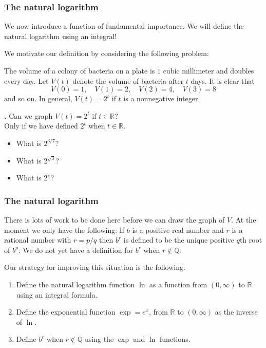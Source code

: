 \documentclass[t]{beamer}
\theoremstyle{plain}
\theoremstyle{definition}
\newcounter{heading}
\newcommand{\newhead}[1]{\medskip\stepcounter{heading}\noindent\textbf{\hspace{0.2cm}{#1}.}}
\newcommand{\RR}{\mathbb{R}}
\newcommand{\Q}{\mathbb{Q}}
\begin{document}
\begin{frame}
\frametitle{The natural logarithm}
\noindent We now introduce a function of fundamental importance.  We will define the natural logarithm using an integral!  \pause


\noindent We motivate our definition by considering the following problem:\pause

\medskip

\noindent The volume of a colony of bacteria on a plate is $1$ cubic millimeter and doubles every day. Let $V(t)$ denote the volume of bacteria after $t$ days. It is clear that
\[V(0)=1,\quad V(1)=2, \quad V(2)=4,\quad V(3)=8\]
and so on. In general, $V(t)=2^t$ if $t$ is a nonnegative integer.\pause

\vfill
\newhead{Question} Can we graph $V(t)=2^t$ if $t\in\RR$?\\ Only if we have defined $2^t$ when $t\in\RR$.
\begin{itemize}[<+->]
\item What is $2^{3/7}$?
\item What is $2^{\sqrt{3}}$?
\item What is $2^{\pi}$?
\end{itemize}
\end{frame}

\begin{frame}
\frametitle{The natural logarithm}
\noindent There is lots of work to be done here before we can draw the graph of $V$. At the moment we only have the following: If $b$ is a positive real number and $r$ is a rational number with $r=p/q$ then $b^r$ is defined to be the unique positive $q$th root of $b^p$. We do not yet have a definition for $b^r$ when $r\notin\Q$.\pause

\smallskip

\noindent Our strategy for improving this situation is the following.
\begin{enumerate}[<+->]
\item Define the natural logarithm function $\ln$ as a function from $(0,\infty)$ to $\mathbb{R}$ using an integral formula.
\item Define the exponential function $\exp = e^{x}$, from $\mathbb{R}$ to $(0, \infty)$ as the inverse of $\ln$.
\item Define $b^r$ when $r\notin\Q$ using the $\exp$ and $\ln$ functions.
\end{enumerate}


\end{frame}
\end{document}
